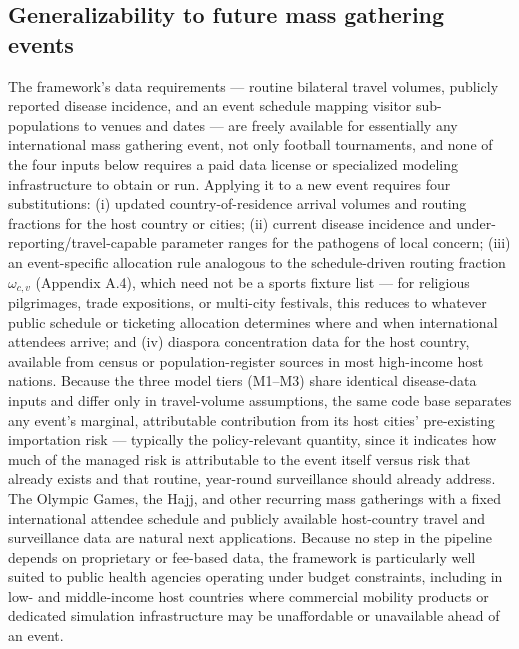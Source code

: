 \documentclass[12pt, a4paper]{article}
\begin{document}
\subsection*{Generalizability to future mass gathering events}

The framework's data requirements --- routine bilateral travel volumes, publicly reported disease incidence, and an event schedule mapping visitor sub-populations to venues and dates --- are freely available for essentially any international mass gathering event, not only football tournaments, and none of the four inputs below requires a paid data license or specialized modeling infrastructure to obtain or run. Applying it to a new event requires four substitutions: (i) updated country-of-residence arrival volumes and routing fractions for the host country or cities; (ii) current disease incidence and under-reporting/travel-capable parameter ranges for the pathogens of local concern; (iii) an event-specific allocation rule analogous to the schedule-driven routing fraction $\omega_{c,v}$ (Appendix A.4), which need not be a sports fixture list --- for religious pilgrimages, trade expositions, or multi-city festivals, this reduces to whatever public schedule or ticketing allocation determines where and when international attendees arrive; and (iv) diaspora concentration data for the host country, available from census or population-register sources in most high-income host nations. Because the three model tiers (M1--M3) share identical disease-data inputs and differ only in travel-volume assumptions, the same code base separates any event's marginal, attributable contribution from its host cities' pre-existing importation risk --- typically the policy-relevant quantity, since it indicates how much of the managed risk is attributable to the event itself versus risk that already exists and that routine, year-round surveillance should already address. The Olympic Games, the Hajj, and other recurring mass gatherings with a fixed international attendee schedule and publicly available host-country travel and surveillance data are natural next applications. Because no step in the pipeline depends on proprietary or fee-based data, the framework is particularly well suited to public health agencies operating under budget constraints, including in low- and middle-income host countries where commercial mobility products or dedicated simulation infrastructure may be unaffordable or unavailable ahead of an event.

\end{document}
